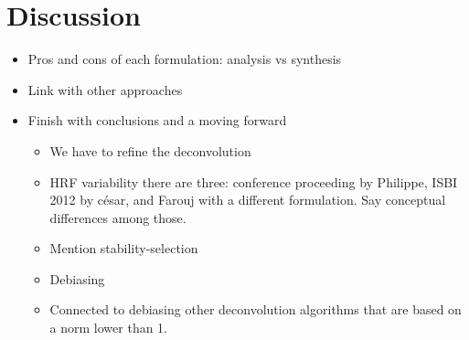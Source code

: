 \section{Discussion}

\begin{itemize}
    \item Pros and cons of each formulation: analysis vs synthesis
    \item Link with other approaches
    \item Finish with conclusions and a moving forward
    \begin{itemize}
        \item We have to refine the deconvolution
        \item HRF variability there are three: conference proceeding by Philippe, ISBI 2012 by césar, and Farouj with a different formulation. Say conceptual differences among those.
        \item Mention stability-selection~\cite{meinshausen2010stability}
        \item Debiasing
        \item Connected to debiasing other deconvolution algorithms that are based on a norm lower than 1.
    \end{itemize}
\end{itemize}